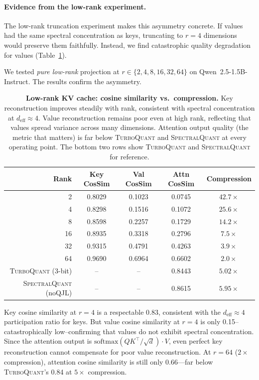 \documentclass[11pt]{article}
\newcommand{\deff}{d_{\mathrm{eff}}}
\newcommand{\TQ}{\textsc{TurboQuant}}
\newcommand{\SQ}{\textsc{SpectralQuant}}
\begin{document}
\paragraph{Evidence from the low-rank experiment.}
The low-rank truncation experiment makes this asymmetry concrete.  If values
had the same spectral concentration as keys, truncating to $r = 4$ dimensions
would preserve them faithfully.  Instead, we find catastrophic quality
degradation for values (Table~\ref{tab:lowrank}).

We tested \emph{pure low-rank} projection at $r \in \{2, 4, 8, 16, 32, 64\}$
on Qwen~2.5-1.5B-Instruct.  The results confirm the asymmetry.

\begin{table}[!htbp]
\centering
\caption{\textbf{Low-rank KV cache: cosine similarity vs.\ compression.}
Key reconstruction improves steadily with rank, consistent with spectral
concentration at $\deff \approx 4$.  Value reconstruction remains poor even
at high rank, reflecting that values spread variance across many dimensions.
Attention output quality (the metric that matters) is far below \TQ{} and \SQ{}
at every operating point.  The bottom two rows show \TQ{} and \SQ{} for reference.}
\label{tab:lowrank}
\footnotesize
\begin{tabular}{rcccc}
\toprule
\textbf{Rank} & \textbf{Key CosSim} & \textbf{Val CosSim} & \textbf{Attn CosSim} & \textbf{Compression} \\
\midrule
2   & 0.8029 & 0.1023 & 0.0745 & $42.7\times$ \\
4   & 0.8298 & 0.1516 & 0.1072 & $25.6\times$ \\
8   & 0.8598 & 0.2257 & 0.1729 & $14.2\times$ \\
16  & 0.8935 & 0.3318 & 0.2796 & $7.5\times$ \\
32  & 0.9315 & 0.4791 & 0.4263 & $3.9\times$ \\
64  & 0.9690 & 0.6964 & 0.6602 & $2.0\times$ \\
\midrule
\TQ{} (3-bit) & -- & -- & 0.8443 & $5.02\times$ \\
\SQ{} (noQJL)  & -- & -- & 0.8615 & $5.95\times$ \\
\bottomrule
\end{tabular}
\end{table}

Key cosine similarity at $r = 4$ is a respectable 0.83, consistent with the
$\deff \approx 4$ participation ratio for keys.  But value cosine similarity at
$r = 4$ is only 0.15--catastrophically low--confirming that values do not
exhibit spectral concentration.  Since the attention output is
$\mathrm{softmax}(QK^\top / \sqrt{d}) \cdot V$, even perfect key reconstruction
cannot compensate for poor value reconstruction.  At $r = 64$ ($2\times$
compression), attention cosine similarity is still only 0.66---far below
\TQ{}'s 0.84 at $5\times$ compression.
\end{document}
